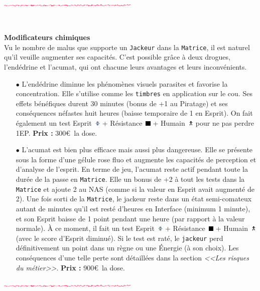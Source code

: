 \documentclass[11pt,twoside,a4paper]{article}
\def\imgESPRI{\includegraphics[width=0.25cm]{../../../../../imgGraphics/rolePlayingGame/SimulacreS/mini12x12/esprit.png} }
\def\imgRESIS{\includegraphics[width=0.25cm]{../../../../../imgGraphics/rolePlayingGame/SimulacreS/mini12x12/resistance.png} }
\def\imgHUMAI{\includegraphics[width=0.25cm]{../../../../../imgGraphics/rolePlayingGame/SimulacreS/mini12x12/humain.png} }
\def\barreCyberAgeHalf{\includegraphics[width=0.50\textwidth]{img/Filet_CA.png}}
\begin{document}
\begin{multicols*}{2}
\barreCyberAgeHalf %

\vfill ~\\ \columnbreak

\textbf{Modificateurs chimiques}~\\
Vu le nombre de malus que supporte un \texttt{Jackeur} dans la \texttt{Matrice}, il est naturel qu'il veuille augmenter ses capacit{\'e}s. C'est possible gr{\^a}ce {\`a} deux drogues, l'end{\'e}drine et l'acumat, qui ont chacune leurs avantages et leurs inconv{\'e}nients. %
\begin{itemize}
	\item[$\bullet$] L'end{\'e}drine diminue les ph{\'e}nom{\`e}nes visuels parasites et favorise la concentration. Elle s'utilise comme les \texttt{timbres} en application sur le cou. Ses effets b{\'e}n{\'e}fiques durent 30 minutes (bonus de +1 au Piratage) et ses cons{\'e}quences n{\'e}fastes huit heures (baisse temporaire de 1 en Esprit). On fait {\'e}galement un test Esprit~\imgESPRI  + R{\'e}sistance~\imgRESIS  + Humain~\imgHUMAI  pour ne pas perdre 1EP. \textbf{Prix : }300\euro ~la dose. 
	\item[$\bullet$] L'acumat est bien plus efficace mais aussi plus dangereuse. Elle se pr{\'e}sente sous la forme d'une g{\'e}lule rose fluo et augmente les capacit{\'e}s de perception et d'analyse de l'esprit. En terme de jeu, l'acumat reste actif pendant toute la dur{\'e}e de la passe en \texttt{Matrice}. Elle un bonus de +2 {\`a} tout les tests dans la \texttt{Matrice} et ajoute 2 au NAS (comme si la valeur en Esprit avait augment{\'e} de 2). Une fois sorti de la \texttt{Matrice}, le jackeur reste dans un {\'e}tat semi-comateux autant de minutes qu'il est rest{\'e} d'heures en Interface (minimum 1 minute), et son Esprit baisse de 1 point pendant une heure (par rapport {\`a} la valeur normale). {\`A} ce moment, il fait un test Esprit~\imgESPRI  + R{\'e}sistance~\imgRESIS  + Humain~\imgHUMAI  (avec le score d'Esprit diminu{\'e}). Si le test est rat{\'e}, le \texttt{jackeur} perd d{\'e}finitivement un point dans un r{\`e}gne ou une {\'E}nergie ({\`a} son choix). Les cons{\'e}quences d'une telle perte sont d{\'e}taill{\'e}es dans la section \emph{<<Les risques du m{\'e}tier>>}. \textbf{Prix : }900\euro ~la dose. ~\\
\end{itemize}

\barreCyberAgeHalf ~\\


\end{multicols*}
\end{document}
